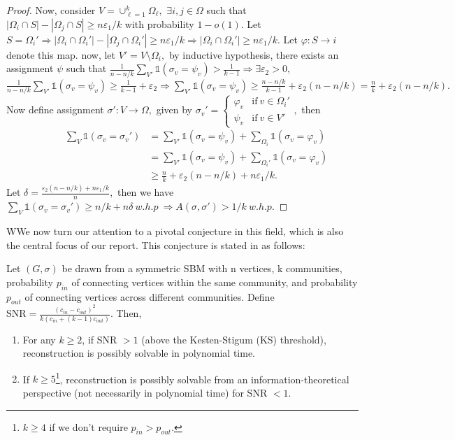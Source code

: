 \begin{proof}
    Now, consider $V=\cup_{\ell=1}^k\Omega_\ell,$ $\exists i, j\in\Omega$ such that $|\Omega_i\cap S|-|\Omega_j\cap S|\geq n\varepsilon_1/k$ with probability $1-o(1).$ Let $S=\Omega_i'\Rightarrow|\Omega_i\cap\Omega_i'|-|\Omega_j\cap\Omega_i'|\geq n\varepsilon_1/k\Rightarrow |\Omega_i\cap\Omega_i'|\geq n\varepsilon_1/k.$ Let $\varphi: S\rightarrow i$ denote this map. now, let $V'=V\setminus\Omega_i,$ by inductive hypothesis, there exists an assignment $\psi$ such that $\frac{1}{n-n/k}\sum_{V'}\mathbb{1}(\sigma_v=\psi_v)>\frac{1}{k-1}\Rightarrow\exists\varepsilon_2>0,$ $\frac{1}{n-n/k}\sum_{V'}\mathbb{1}(\sigma_v=\psi_v)\geq\frac{1}{k-1}+\varepsilon_2\Rightarrow\sum_{V'}\mathbb{1}(\sigma_v=\psi_v)\geq\frac{n-n/k}{k-1}+\varepsilon_2(n-n/k)=\frac{n}{k}+\varepsilon_2(n-n/k).$ Now define assignment $\sigma': V\rightarrow\Omega,$ given by $\sigma_v'=\begin{cases}
        \varphi_v & \text{if}~v\in\Omega_i'\\
        \psi_v & \text{if}~v\in V'
    \end{cases},$ then \begin{align*}
        ~~~~~~~~~~~~~\sum_V\mathbb{1}(\sigma_v=\sigma_v')&=\sum_{V'}\mathbb{1}(\sigma_v=\psi_v)+\sum_{\Omega_i}\mathbb{1}(\sigma_v=\varphi_v)\\
        &=\sum_{V'}\mathbb{1}(\sigma_v=\psi_v)+\sum_{\Omega_i'}\mathbb{1}(\sigma_v=\varphi_v)\\
        &\geq\frac{n}{k}+\varepsilon_2(n-n/k)+n\varepsilon_1/k.
    \end{align*}
    Let $\delta=\frac{\varepsilon_2(n-n/k)+n\varepsilon_1/k}{n},$ then we have $\sum_V\mathbb{1}(\sigma_v=\sigma_v')\geq n/k+n\delta~w.h.p~\Rightarrow A(\sigma, \sigma')>1/k~w.h.p.$
\end{proof}
WWe now turn our attention to a pivotal conjecture in this field, which is also the central focus of our report. This conjecture is stated in \cite{TheConjecture} as follows:
\begin{conjecture}\label{Conj}
    Let $(G, \sigma)$ be drawn from a symmetric SBM with n vertices, k communities, probability $p_{in}$ of connecting vertices within the same community, and probability $p_{out}$ of connecting vertices across different communities. Define $\text{SNR} = \frac{(c_{in}-c_{out})^2}{k(c_{in}+(k-1)c_{out})}.$ Then,
\begin{enumerate}
    \item For any \(k \geq 2\), if SNR \(> 1\) (above the Kesten-Stigum (KS) threshold), reconstruction is possibly solvable in polynomial time.
    \item If \(k \geq 5\)\footnote{$k\geq4$ if we don't require $p_{in}>p_{out}.$},  reconstruction is possibly solvable from an information-theoretical perspective (not necessarily in polynomial time) for SNR $<1$.
\end{enumerate}
\end{conjecture}
